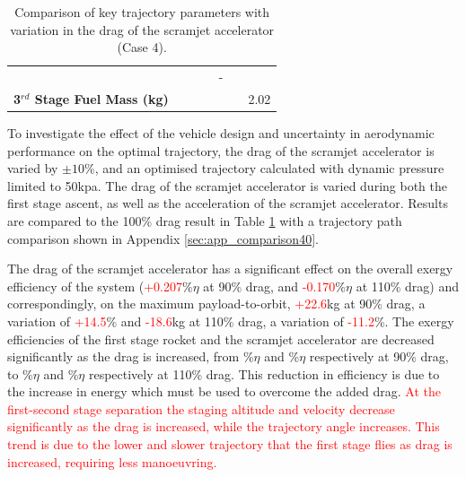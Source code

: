 \begin{table}[ht!]
\begin{tabular}{l c c c c c c}
		& \thirdqOverFiveCdStandardNoReturn
		& \thirdqOverFiveCdOneHundredFiveNoReturn
		& \thirdqOverFiveCdOneHundredTenNoReturn
		& -
		\\
		\textbf{3$^{rd}$ Stage Fuel Mass (kg)}
		& \thirdmFuelCdNinetyNoReturn
		& \thirdmFuelCdNinetyFiveNoReturn
		& \thirdmFuelCdStandardNoReturn
		& \thirdmFuelCdOneHundredFiveNoReturn
		& \thirdmFuelCdOneHundredTenNoReturn
		&2.02
		\\
		\hline 
	\end{tabular} 
	\caption{Comparison of key trajectory parameters with variation in the drag of the scramjet accelerator (Case 4).}
	\label{tab:DragVariationNoReturn}
\end{table}

To investigate the effect of the vehicle design and uncertainty in aerodynamic performance on the optimal trajectory, the drag of the scramjet accelerator is varied by $\pm10$\%, and an optimised trajectory calculated with dynamic pressure limited to 50kpa. The drag of the scramjet accelerator is varied during both the first stage ascent, as well as the acceleration of the scramjet accelerator. Results are compared to the 100\% drag result in Table \ref{tab:DragVariationNoReturn} with a trajectory path comparison shown in Appendix \ref{sec:app_comparison40}. 

The drag of the scramjet accelerator has a significant effect on the overall exergy efficiency of the system (\textcolor{red}{+0.207}\%$\eta$ at 90\% drag, and \textcolor{red}{-0.170}\%$\eta$ at 110\% drag) and correspondingly, on the maximum payload-to-orbit, \textcolor{red}{+22.6}kg at 90\% drag, a variation of \textcolor{red}{+14.5}\% and \textcolor{red}{-18.6}kg at 110\% drag, a variation of \textcolor{red}{-11.2}\%. The exergy efficiencies of the first stage rocket and the scramjet accelerator are decreased significantly as the drag is increased, from \firstExergyEffCdNinetyNoReturn\%$\eta$ and \secondExergyEffCdNinetyNoReturn\%$\eta$ respectively at 90\% drag, to \firstExergyEffCdOneHundredTenNoReturn\%$\eta$ and \secondExergyEffCdOneHundredTenNoReturn\%$\eta$ respectively at 110\% drag. This reduction in efficiency is due to the increase in energy which must be used to overcome the added drag. 
\textcolor{red}{
At the first-second stage separation the staging altitude and velocity decrease significantly as the drag is increased, while the trajectory angle increases. This trend is due to the lower and slower trajectory that the first stage flies as drag is increased, requiring less manoeuvring. }


